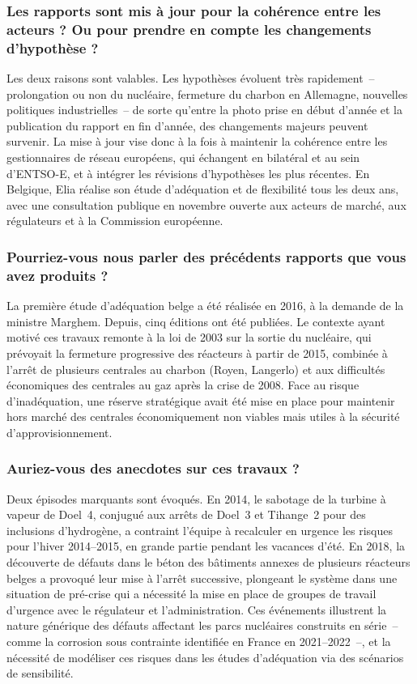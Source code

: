 \subsubsection{Les rapports sont mis à jour pour la cohérence entre les acteurs ? Ou pour prendre en compte les changements d'hypothèse ?}

Les deux raisons sont valables. Les hypothèses évoluent très rapidement~-- prolongation ou non du nucléaire, fermeture du charbon en Allemagne, nouvelles politiques industrielles~-- de sorte qu'entre la photo prise en début d'année et la publication du rapport en fin d'année, des changements majeurs peuvent survenir. La mise à jour vise donc à la fois à maintenir la cohérence entre les gestionnaires de réseau européens, qui échangent en bilatéral et au sein d'ENTSO-E, et à intégrer les révisions d'hypothèses les plus récentes. En Belgique, Elia réalise son étude d'adéquation et de flexibilité tous les deux ans, avec une consultation publique en novembre ouverte aux acteurs de marché, aux régulateurs et à la Commission européenne.

\subsubsection{Pourriez-vous nous parler des précédents rapports que vous avez produits ?}

La première étude d'adéquation belge a été réalisée en 2016, à la demande de la ministre Marghem. Depuis, cinq éditions ont été publiées. Le contexte ayant motivé ces travaux remonte à la loi de 2003 sur la sortie du nucléaire, qui prévoyait la fermeture progressive des réacteurs à partir de 2015, combinée à l'arrêt de plusieurs centrales au charbon (Royen, Langerlo) et aux difficultés économiques des centrales au gaz après la crise de 2008. Face au risque d'inadéquation, une réserve stratégique avait été mise en place pour maintenir hors marché des centrales économiquement non viables mais utiles à la sécurité d'approvisionnement.

\subsubsection{Auriez-vous des anecdotes sur ces travaux ?}

Deux épisodes marquants sont évoqués. En 2014, le sabotage de la turbine à vapeur de Doel~4, conjugué aux arrêts de Doel~3 et Tihange~2 pour des inclusions d'hydrogène, a contraint l'équipe à recalculer en urgence les risques pour l'hiver 2014--2015, en grande partie pendant les vacances d'été. En 2018, la découverte de défauts dans le béton des bâtiments annexes de plusieurs réacteurs belges a provoqué leur mise à l'arrêt successive, plongeant le système dans une situation de pré-crise qui a nécessité la mise en place de groupes de travail d'urgence avec le régulateur et l'administration. Ces événements illustrent la nature générique des défauts affectant les parcs nucléaires construits en série~-- comme la corrosion sous contrainte identifiée en France en 2021--2022~--, et la nécessité de modéliser ces risques dans les études d'adéquation via des scénarios de sensibilité.

